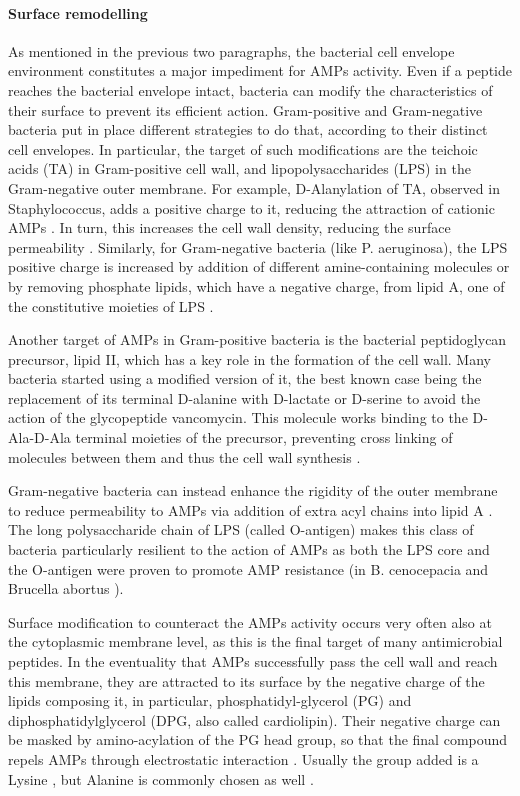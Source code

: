 \paragraph{Surface remodelling}
As mentioned in the previous two paragraphs, the bacterial cell envelope environment constitutes a major impediment for AMPs activity.
%
Even if a peptide reaches the bacterial envelope intact, bacteria can modify the characteristics of their surface to prevent its efficient action.
%
Gram-positive and Gram-negative bacteria put in place different strategies to do that, according to their distinct cell envelopes. In particular, the target of such modifications are the teichoic acids (TA) in Gram-positive cell wall, and lipopolysaccharides (LPS) in the Gram-negative outer membrane.
%
For example, D-Alanylation of TA, observed in Staphylococcus, adds a positive charge to it, reducing the attraction of cationic AMPs \cite{Peschel1999,Fabretti2006,Saar-Dover2012}.
%
In turn, this increases the cell wall density, reducing the surface permeability \cite{Saar-Dover2012}.
%
Similarly, for Gram-negative bacteria (like P. aeruginosa), the LPS positive charge is increased by addition of different amine-containing molecules \cite{Moskowitz2004,Gunn1998} or by removing phosphate lipids, which have a negative charge, from lipid A, one of the constitutive moieties of LPS \cite{Wang2004MsbA,Wang2006lpx}.

Another target of AMPs in Gram-positive bacteria is the bacterial peptidoglycan precursor, lipid II, which has a key role in the formation of the cell wall. Many bacteria started using a modified version of it,
the best known case being the replacement of its terminal D-alanine with D-lactate or D-serine \cite{Bugg1991} to avoid the action of the glycopeptide vancomycin. This molecule works binding to the D-Ala-D-Ala terminal moieties of the precursor, preventing cross linking of molecules between them and thus the cell wall synthesis \cite{Brotz1998}.

Gram-negative bacteria can instead enhance the rigidity of the outer membrane to reduce permeability to AMPs via addition of extra acyl chains into lipid A \cite{Guo1998,Bishop2000}. The long polysaccharide chain of LPS (called O-antigen) makes this class of bacteria particularly resilient to the action of AMPs \cite{Silhavy2010} as both the LPS core and the O-antigen were proven to promote AMP resistance (in B. cenocepacia and Brucella abortus \cite{Loutet2006,Allen1998}).

Surface modification to counteract the AMPs activity occurs very often also at the cytoplasmic membrane level, as this is the final target of many antimicrobial peptides. In the eventuality that AMPs successfully pass the cell wall and reach this membrane, they are attracted to its surface by the negative charge of the lipids composing it, in particular, phosphatidyl-glycerol (PG) and diphosphatidylglycerol (DPG, also called cardiolipin). Their negative charge can be masked by amino-acylation of the PG head group, so that the final compound repels AMPs through electrostatic interaction \cite{Peschel2001}. Usually the group added is a Lysine \cite{Thedieck2006}, but Alanine is commonly chosen as well \cite{Klein2009}.

